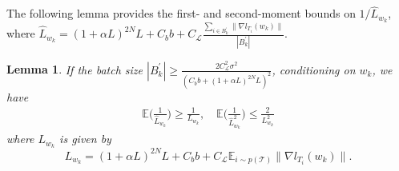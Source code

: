 \documentclass{osudissert96}
\newtheorem{lemma}{Lemma}
\begin{document}
The following lemma provides the first- and second-moment bounds on $1/\hat L_{w_k}$, where  
$\hat L_{w_k} =(1+\alpha L)^{2N}L + C_b b +  C_\mathcal{L}\frac{\sum_{i \in B_k^\prime}\|\nabla l_{T_i}(w_k)\|}{|B_k^\prime|}$.
\begin{lemma}\label{le:betak}
	If the batch size $|B_k^\prime| \geq \frac{2C^2_\mathcal{L}\sigma^2}{( C_b b + (1+\alpha L)^{2N} L)^2}$, conditioning on $w_k$, we have
	\begin{align*}
	\mathbb{E} \Big( \frac{1}{\hat L_{w_k}}  \Big) \geq \frac{1}{L_{w_k}}, \quad \mathbb{E} \Big( \frac{1}{\hat L^2_{w_k}}  \Big) \leq \frac{2}{L^2_{w_k}} 
	\end{align*}
	where $L_{w_k}$ is given by $$L_{w_k}= (1+\alpha L)^{2N}L + C_b b +  C_\mathcal{L} \mathbb{E}_{i\sim p(\mathcal{T})}\|\nabla l_{T_i}(w_k)\|.$$
\end{lemma}
\end{document}
